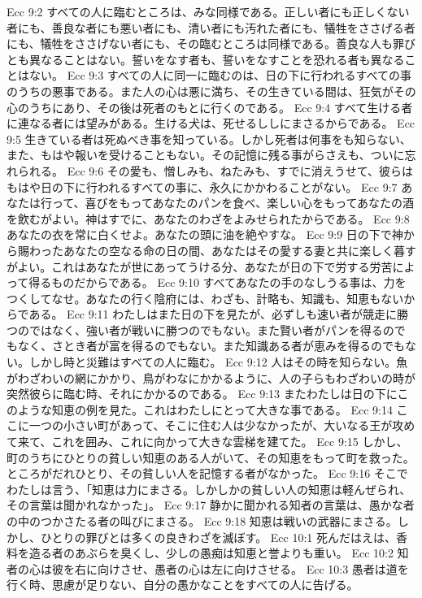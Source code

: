 Ecc 9:2  すべての人に臨むところは、みな同様である。正しい者にも正しくない者にも、善良な者にも悪い者にも、清い者にも汚れた者にも、犠牲をささげる者にも、犠牲をささげない者にも、その臨むところは同様である。善良な人も罪びとも異なることはない。誓いをなす者も、誓いをなすことを恐れる者も異なることはない。
Ecc 9:3  すべての人に同一に臨むのは、日の下に行われるすべての事のうちの悪事である。また人の心は悪に満ち、その生きている間は、狂気がその心のうちにあり、その後は死者のもとに行くのである。
Ecc 9:4  すべて生ける者に連なる者には望みがある。生ける犬は、死せるししにまさるからである。
Ecc 9:5  生きている者は死ぬべき事を知っている。しかし死者は何事をも知らない、また、もはや報いを受けることもない。その記憶に残る事がらさえも、ついに忘れられる。
Ecc 9:6  その愛も、憎しみも、ねたみも、すでに消えうせて、彼らはもはや日の下に行われるすべての事に、永久にかかわることがない。
Ecc 9:7  あなたは行って、喜びをもってあなたのパンを食べ、楽しい心をもってあなたの酒を飲むがよい。神はすでに、あなたのわざをよみせられたからである。
Ecc 9:8  あなたの衣を常に白くせよ。あなたの頭に油を絶やすな。
Ecc 9:9  日の下で神から賜わったあなたの空なる命の日の間、あなたはその愛する妻と共に楽しく暮すがよい。これはあなたが世にあってうける分、あなたが日の下で労する労苦によって得るものだからである。
Ecc 9:10  すべてあなたの手のなしうる事は、力をつくしてなせ。あなたの行く陰府には、わざも、計略も、知識も、知恵もないからである。
Ecc 9:11  わたしはまた日の下を見たが、必ずしも速い者が競走に勝つのではなく、強い者が戦いに勝つのでもない。また賢い者がパンを得るのでもなく、さとき者が富を得るのでもない。また知識ある者が恵みを得るのでもない。しかし時と災難はすべての人に臨む。
Ecc 9:12  人はその時を知らない。魚がわざわいの網にかかり、鳥がわなにかかるように、人の子らもわざわいの時が突然彼らに臨む時、それにかかるのである。
Ecc 9:13  またわたしは日の下にこのような知恵の例を見た。これはわたしにとって大きな事である。
Ecc 9:14  ここに一つの小さい町があって、そこに住む人は少なかったが、大いなる王が攻めて来て、これを囲み、これに向かって大きな雲梯を建てた。
Ecc 9:15  しかし、町のうちにひとりの貧しい知恵のある人がいて、その知恵をもって町を救った。ところがだれひとり、その貧しい人を記憶する者がなかった。
Ecc 9:16  そこでわたしは言う、「知恵は力にまさる。しかしかの貧しい人の知恵は軽んぜられ、その言葉は聞かれなかった」。
Ecc 9:17  静かに聞かれる知者の言葉は、愚かな者の中のつかさたる者の叫びにまさる。
Ecc 9:18  知恵は戦いの武器にまさる。しかし、ひとりの罪びとは多くの良きわざを滅ぼす。
Ecc 10:1  死んだはえは、香料を造る者のあぶらを臭くし、少しの愚痴は知恵と誉よりも重い。
Ecc 10:2  知者の心は彼を右に向けさせ、愚者の心は左に向けさせる。
Ecc 10:3  愚者は道を行く時、思慮が足りない、自分の愚かなことをすべての人に告げる。
